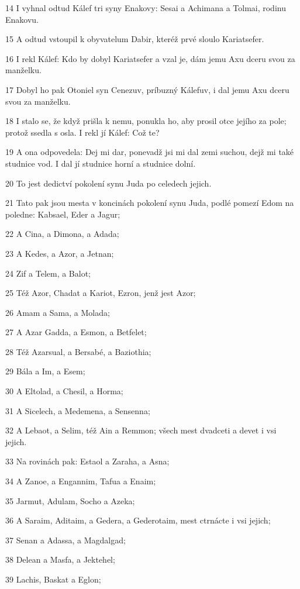 \par 14 I vyhnal odtud Kálef tri syny Enakovy: Sesai a Achimana a Tolmai, rodinu Enakovu.
\par 15 A odtud vstoupil k obyvatelum Dabir, kteréž prvé sloulo Kariatsefer.
\par 16 I rekl Kálef: Kdo by dobyl Kariatsefer a vzal je, dám jemu Axu dceru svou za manželku.
\par 17 Dobyl ho pak Otoniel syn Cenezuv, príbuzný Kálefuv, i dal jemu Axu dceru svou za manželku.
\par 18 I stalo se, že když prišla k nemu, ponukla ho, aby prosil otce jejího za pole; protož ssedla s osla. I rekl jí Kálef: Což te?
\par 19 A ona odpovedela: Dej mi dar, ponevadž jsi mi dal zemi suchou, dejž mi také studnice vod. I dal jí studnice horní a studnice dolní.
\par 20 To jest dedictví pokolení synu Juda po celedech jejich.
\par 21 Tato pak jsou mesta v koncinách pokolení synu Juda, podlé pomezí Edom na poledne: Kabsael, Eder a Jagur;
\par 22 A Cina, a Dimona, a Adada;
\par 23 A Kedes, a Azor, a Jetnan;
\par 24 Zif a Telem, a Balot;
\par 25 Též Azor, Chadat a Kariot, Ezron, jenž jest Azor;
\par 26 Amam a Sama, a Molada;
\par 27 A Azar Gadda, a Esmon, a Betfelet;
\par 28 Též Azarsual, a Bersabé, a Baziothia;
\par 29 Bála a Im, a Esem;
\par 30 A Eltolad, a Chesil, a Horma;
\par 31 A Sicelech, a Medemena, a Sensenna;
\par 32 A Lebaot, a Selim, též Ain a Remmon; všech mest dvadceti a devet i vsi jejich.
\par 33 Na rovinách pak: Estaol a Zaraha, a Asna;
\par 34 A Zanoe, a Engannim, Tafua a Enaim;
\par 35 Jarmut, Adulam, Socho a Azeka;
\par 36 A Saraim, Aditaim, a Gedera, a Gederotaim, mest ctrnácte i vsi jejich;
\par 37 Senan a Adassa, a Magdalgad;
\par 38 Delean a Masfa, a Jektehel;
\par 39 Lachis, Baskat a Eglon;
